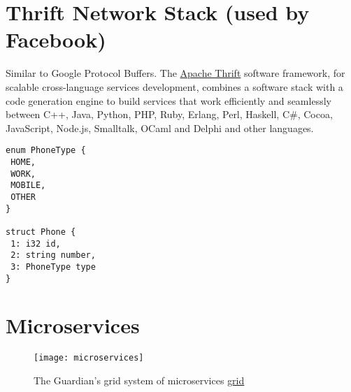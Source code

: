 \section{Thrift Network Stack (used by Facebook)}

Similar to Google Protocol Buffers. The \href{https://thrift.apache.org/}{Apache Thrift} software framework, for scalable cross-language services development, combines a software stack with a code generation engine to build services that work efficiently and seamlessly between C++, Java, Python, PHP, Ruby, Erlang, Perl, Haskell, C\#, Cocoa, JavaScript, Node.js, Smalltalk, OCaml and Delphi and other languages.

\begin{verbatim}
enum PhoneType {
 HOME,
 WORK,
 MOBILE,
 OTHER
}

struct Phone {
 1: i32 id,
 2: string number,
 3: PhoneType type
}
\end{verbatim}


\section{Microservices}

\begin{figure}[htbp]
\texttt{[image: microservices]}
\caption{The Guardian's grid system of microservices \href{https://www.theguardian.com/info/developer-blog/2015/aug/12/open-sourcing-grid-image-service}{grid}}
\end{figure}





